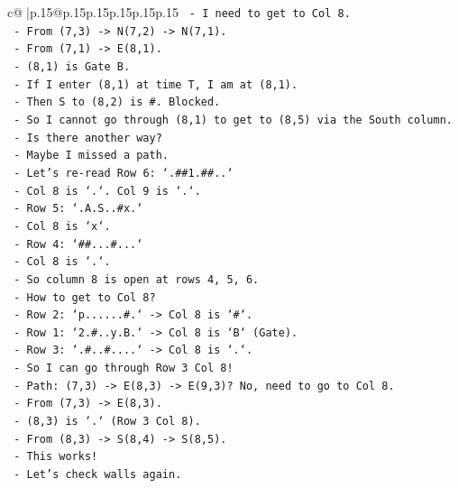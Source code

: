 \documentclass{article}
\begin{document}
{\begin{supertabular}{c@{$\;$}|p{.15\linewidth}@{}p{.15\linewidth}p{.15\linewidth}p{.15\linewidth}p{.15\linewidth}p{.15\linewidth}}
{{{\texttt{          {-} I need to get to Col 8.} \\
\texttt{          {-} From (7,3) {-}> N(7,2) {-}> N(7,1).} \\
\texttt{          {-} From (7,1) {-}> E(8,1).} \\
\texttt{          {-} (8,1) is Gate B.} \\
\texttt{          {-} If I enter (8,1) at time T, I am at (8,1).} \\
\texttt{          {-} Then S to (8,2) is \#. Blocked.} \\
\texttt{          {-} So I cannot go through (8,1) to get to (8,5) via the South column.} \\
\texttt{          {-} Is there another way?} \\
\texttt{          {-} Maybe I missed a path.} \\
\texttt{          {-} Let's re{-}read Row 6: `.\#\#1.\#\#..`} \\
\texttt{            {-} Col 8 is `.`. Col 9 is `.`.} \\
\texttt{          {-} Row 5: `.A.S..\#x.`} \\
\texttt{            {-} Col 8 is `x`.} \\
\texttt{          {-} Row 4: `\#\#...\#...`} \\
\texttt{            {-} Col 8 is `.`.} \\
\texttt{          {-} So column 8 is open at rows 4, 5, 6.} \\
\texttt{          {-} How to get to Col 8?} \\
\texttt{          {-} Row 2: `p......\#.` {-}> Col 8 is `\#`.} \\
\texttt{          {-} Row 1: `2.\#..y.B.` {-}> Col 8 is `B` (Gate).} \\
\texttt{          {-} Row 3: `.\#..\#....` {-}> Col 8 is `.`.} \\
\texttt{          {-} So I can go through Row 3 Col 8!} \\
\texttt{          {-} Path: (7,3) {-}> E(8,3) {-}> E(9,3)? No, need to go to Col 8.} \\
\texttt{          {-} From (7,3) {-}> E(8,3).} \\
\texttt{          {-} (8,3) is `.` (Row 3 Col 8).} \\
\texttt{          {-} From (8,3) {-}> S(8,4) {-}> S(8,5).} \\
\texttt{          {-} This works!} \\
\texttt{          {-} Let's check walls again.} \\
}}}
\end{supertabular}}
\end{document}
